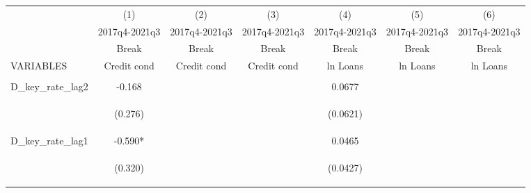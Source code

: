 \documentclass[]{article}
\begin{document}
\begin{center}
\begin{tabular}{lcccccc} \hline
 & (1) & (2) & (3) & (4) & (5) & (6) \\
 & 2017q4-2021q3 & 2017q4-2021q3 & 2017q4-2021q3 & 2017q4-2021q3 & 2017q4-2021q3 & 2017q4-2021q3 \\
 & Break & Break & Break & Break & Break & Break \\
VARIABLES & Credit cond & Credit cond & Credit cond & ln Loans & ln Loans & ln Loans \\ \hline
\vspace{4pt} & \begin{footnotesize}\end{footnotesize} & \begin{footnotesize}\end{footnotesize} & \begin{footnotesize}\end{footnotesize} & \begin{footnotesize}\end{footnotesize} & \begin{footnotesize}\end{footnotesize} & \begin{footnotesize}\end{footnotesize} \\
D\_key\_rate\_lag2 & -0.168 &  &  & 0.0677 &  &  \\
\vspace{4pt} & \begin{footnotesize}(0.276)\end{footnotesize} & \begin{footnotesize}\end{footnotesize} & \begin{footnotesize}\end{footnotesize} & \begin{footnotesize}(0.0621)\end{footnotesize} & \begin{footnotesize}\end{footnotesize} & \begin{footnotesize}\end{footnotesize} \\
D\_key\_rate\_lag1 & -0.590* &  &  & 0.0465 &  &  \\
\vspace{4pt} & \begin{footnotesize}(0.320)\end{footnotesize} & \begin{footnotesize}\end{footnotesize} & \begin{footnotesize}\end{footnotesize} & \begin{footnotesize}(0.0427)\end{footnotesize} & \begin{footnotesize}\end{footnotesize} & \begin{footnotesize}\end{footnotesize} \\

\end{tabular}
\end{center}
\end{document}
